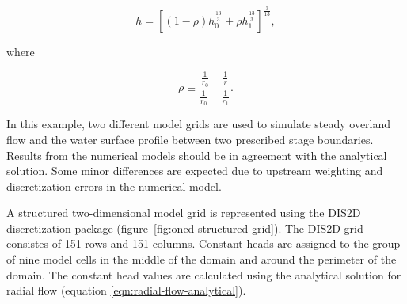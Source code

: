 \documentclass[fleqn]{article}
\begin{document}
\begin{equation}
  h = \left [ \left (1 - \rho \right ) h^{\frac{13}{3}}_{0} + \rho h^{\frac{13}{3}}_{1} \right ]^{\frac{3}{13}} ,
  \label{eqn:radial-flow-analytical}
\end{equation}

\noindent where

\begin{equation}
  \rho \equiv \frac{\frac{1}{r_{0}} - \frac{1}{r}}{\frac{1}{r_{0}} - \frac{1}{r_{1}}} .
  \label{eqn:rho_defined}
\end{equation}

In this example, two different model grids are used to simulate steady overland flow and the water surface profile between two prescribed stage boundaries.  Results from the numerical models should be in agreement with the analytical solution.  Some minor differences are expected due to upstream weighting and discretization errors in the numerical model.

A structured two-dimensional model grid is represented using the DIS2D discretization package (figure~\ref{fig:oned-structured-grid}).  The DIS2D grid consistes of 151 rows and 151 columns.  Constant heads are assigned to the group of nine model cells in the middle of the domain and around the perimeter of the domain.  The constant head values are calculated using the analytical solution for radial flow (equation \ref{eqn:radial-flow-analytical}).
\end{document}

